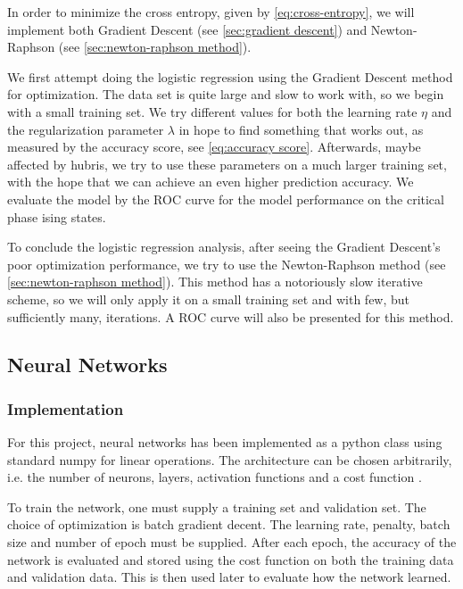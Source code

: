 In order to minimize the cross entropy, given by \autoref{eq:cross-entropy}, we will implement both Gradient Descent (see \autoref{sec:gradient descent}) and Newton-Raphson (see \autoref{sec:newton-raphson method}). 

We first attempt doing the logistic regression using the Gradient Descent method for optimization. The data set is quite large and slow to work with, so we begin with a small training set. We try different values for both the learning rate $\eta$ and the regularization parameter $\lambda$ in hope to find something that works out, as measured by the accuracy score, see \autoref{eq:accuracy score}. Afterwards, maybe affected by hubris, we try to use these parameters on a much larger training set, with the hope that we can achieve an even higher prediction accuracy. We evaluate the model by the ROC curve for the model performance on the critical phase ising states.

To conclude the logistic regression analysis, after seeing the Gradient Descent's poor optimization performance, we try to use the Newton-Raphson method (see \autoref{sec:newton-raphson method}). This method has a notoriously slow iterative scheme, so we will only apply it on a small training set and with few, but sufficiently many, iterations. A ROC curve will also be presented for this method.

\subsection{Neural Networks}\label{sec:method NN}
\subsubsection{Implementation}
For this project, neural networks has been implemented as a python class using standard numpy for linear operations. The architecture can be chosen arbitrarily, i.e. the number of neurons, layers, activation functions and a cost function .

To train the network, one must supply a training set and validation set. The choice of optimization is batch gradient decent. The learning rate, penalty, batch size and number of epoch must be supplied. After each epoch, the accuracy of the network is evaluated and stored using the cost function on both the training data and validation data. This is then used later to evaluate how the network learned.

